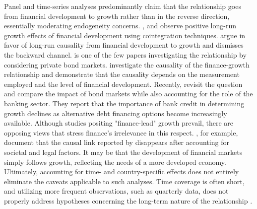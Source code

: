 Panel and time-series analyses predominantly claim that the relationship goes from financial development to growth rather than in the reverse direction, essentially moderating endogeneity concerns.  \citet{ChristopoulosTsionas2004}, \citet{Finketal2003} and \citet{PeiaRoszbach2015} observe positive long-run growth effects of financial development using cointegration techniques. \citet{ChristopoulosTsionas2004} argue in favor of long-run causality from financial development to growth and dismisses the backward channel. \citet{Finketal2003} is one of the few papers investigating the relationship by considering private bond markets. \citet{PeiaRoszbach2015} investigate the causality of the finance-growth relationship and demonstrate that the causality depends on the measurement employed and the level of financial development. Recently, \citet{Thumrongvitetal2013} revisit the question and compare the impact of bond markets while also accounting for the role of the banking sector. They report that the importance of bank credit in determining growth declines as alternative debt financing options become increasingly available. Although studies positing "finance-lead" growth prevail, there are opposing views that stress finance's irrelevance in this respect. \citet{Garretsenetal2004}, for example, document that the causal link reported by \citet{RajanZingales1998} disappears after accounting for societal and legal factors. It may be that the development of financial markets simply follows growth, reflecting the needs of a more developed economy. Ultimately, accounting for time- and country-specific effects does not entirely eliminate the caveats applicable to such analyses. Time coverage is often short, and utilizing more frequent observations, such as quarterly data, does not properly address hypotheses concerning the long-term nature of the relationship \citep{Ang2008}. 

